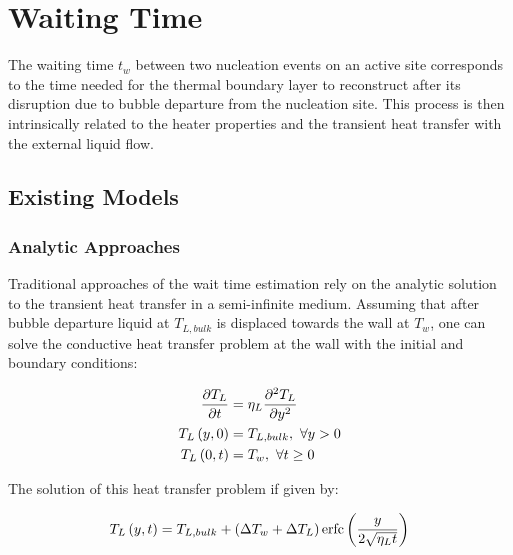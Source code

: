 \section{Waiting Time}
\label{sec:wait_time}

The waiting time $t_{w}$ between two nucleation events on an active site corresponds to the time needed for the thermal boundary layer to reconstruct after its disruption due to bubble departure from the nucleation site. This process is then intrinsically related to the heater properties and the transient heat transfer with the external liquid flow.



\subsection{Existing Models}

\subsubsection{Analytic Approaches}

Traditional approaches of the wait time estimation rely on the analytic solution to the transient heat transfer in a semi-infinite medium. Assuming that after bubble departure liquid at $T_{L,bulk}$ is displaced towards the wall at $T_{w}$, one can solve the conductive heat transfer problem at the wall with the initial and boundary conditions:

\begin{align}
\frac{\partial T_{L}}{\partial t} &= \eta_{L} \frac{\partial^{2} T_{L}}{\partial y^{2}}\\
T_{L}\left( y,0 \right) &= T_{L,bulk},\ \forall y >0\\
T_{L}\left( 0,t \right) &= T_{w},\ \forall t \geq 0
\end{align}


The solution of this heat transfer problem if given by:


\begin{equation}
T_{L}\left( y,t \right) = T_{L,bulk} + \left( \Delta T_{w} + \Delta T_{L} \right)\mathrm{erfc}\left( \frac{y}{2\sqrt{\eta_{L}t}} \right)
\label{eq:TL_transient}
\end{equation}

